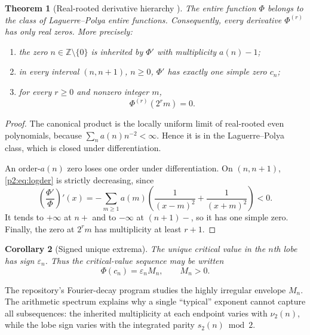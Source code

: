 \documentclass[11pt]{article}
\numberwithin{equation}{section}
\newtheorem{theorem}{Theorem}[section]
\newtheorem{corollary}[theorem]{Corollary}
\theoremstyle{definition}
\theoremstyle{remark}
\newcommand{\Z}{\mathbb Z}
\begin{document}
\begin{theorem}[Real-rooted derivative hierarchy \Derived]
\label{p2:thm:LP}
The entire function $\Phi$ belongs to the class of Laguerre--Polya entire functions.  Consequently,
every derivative $\Phi^{(r)}$ has only real zeros.  More precisely:
\begin{enumerate}
\item the zero $n\in\Z\setminus\{0\}$ is inherited by $\Phi'$ with multiplicity
      $a(n)-1$;
\item in every interval $(n,n+1)$, $n\ge0$, $\Phi'$ has exactly one simple zero
      $c_n$;
\item for every $r\ge0$ and nonzero integer $m$,
      \begin{equation}
       \Phi^{(r)}(2^r m)=0.                                \label{p2:eq:derivative-lattice}
      \end{equation}
\end{enumerate}
\end{theorem}

\begin{proof}
The canonical product is the locally uniform limit of real-rooted even
polynomials, because $\sum_n a(n)n^{-2}<\infty$.  Hence it is in the
Laguerre--Polya class, which is closed under differentiation.

An order-$a(n)$ zero loses one order under differentiation.  On $(n,n+1)$,
\eqref{p2:eq:logder} is strictly decreasing, since
\[
 \left(\frac{\Phi'}{\Phi}\right)'(x)
 =-\sum_{m\ge1}a(m)\left(\frac1{(x-m)^2}+\frac1{(x+m)^2}\right)<0.
\]
It tends to $+\infty$ at $n+$ and to $-\infty$ at $(n+1)-$, so it has one
simple zero.  Finally, the zero at $2^rm$ has multiplicity at least $r+1$.
\end{proof}

\begin{corollary}[Signed unique extrema]
The unique critical value in the $n$th lobe has sign $\varepsilon_n$.  Thus the
critical-value sequence may be written
\begin{equation}
 \Phi(c_n)=\varepsilon_n M_n,\qquad M_n>0.                 \label{p2:eq:critical-sign}
\end{equation}
\end{corollary}

The repository's Fourier-decay program studies the highly irregular envelope
$M_n$.  The arithmetic spectrum explains why a single ``typical'' exponent cannot
capture all subsequences: the inherited multiplicity at each endpoint varies
with $\nu_2(n)$, while the lobe sign varies with the integrated parity
$s_2(n)\bmod2$.
\end{document}
